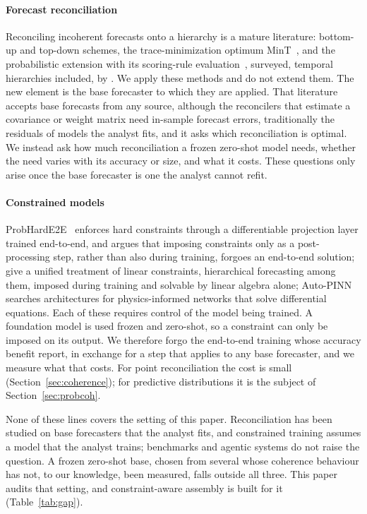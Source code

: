 \documentclass[review,number]{elsarticle}
\begin{document}
\paragraph{Forecast reconciliation} Reconciling incoherent forecasts onto a
hierarchy is a mature literature: bottom-up and top-down schemes, the
trace-minimization optimum MinT~\citep{mint2019}, and the probabilistic extension with
its scoring-rule evaluation~\citep{probrecon2023}, surveyed, temporal hierarchies
included, by \citet{hfreview2024}. We
apply these methods and do not extend them. The new element is the base forecaster to
which they are applied. That literature accepts base forecasts from any source, although the reconcilers
that estimate a covariance or weight matrix need in-sample forecast errors,
traditionally the residuals of models the analyst fits, and it asks which
reconciliation is optimal. We instead ask how much
reconciliation a frozen zero-shot model needs, whether the need varies with its
accuracy or size, and what it costs. These questions only arise once the base
forecaster is one the analyst cannot refit.

\paragraph{Constrained models} ProbHardE2E~\citep{probharde2e2025} enforces hard
constraints through a differentiable projection layer trained end-to-end, and argues
that imposing constraints only as a post-processing step, rather than also during
training, forgoes an end-to-end solution;
\citet{doumeche2025} give a unified treatment of linear constraints, hierarchical
forecasting among them, imposed during training and solvable by linear algebra alone;
Auto-PINN~\citep{autopinn2022} searches architectures for physics-informed networks that
solve differential equations. Each of these
requires control of the model being trained. A foundation model is used frozen and
zero-shot, so a constraint can only be imposed on
its output. We therefore forgo the end-to-end training whose accuracy benefit
\citet{probharde2e2025} report, in exchange for a step that applies to any base
forecaster, and we measure what that costs. For point reconciliation the cost is small
(Section~\ref{sec:coherence}); for predictive distributions it is the subject of
Section~\ref{sec:probcoh}.

None of these lines covers the setting of this paper. Reconciliation has been studied
on base forecasters that the analyst fits, and constrained training assumes a model that
the analyst trains; benchmarks and agentic systems do not raise the question. A frozen
zero-shot base, chosen from several whose coherence behaviour has not, to our knowledge,
been measured,
falls outside all three. This paper audits that setting, and constraint-aware
assembly is built for it (Table~\ref{tab:gap}).
\end{document}
